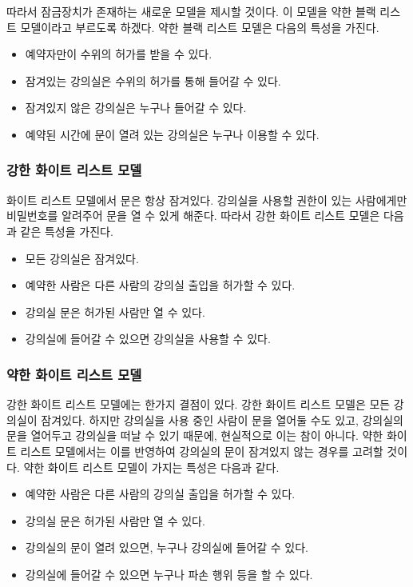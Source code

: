 \documentclass[11pt,a4paper]{article}
\begin{document}
따라서 잠금장치가 존재하는 새로운 모델을 제시할 것이다. 이 모델을 약한 블랙
리스트 모델이라고 부르도록 하겠다. 약한 블랙 리스트 모델은 다음의 특성을
가진다.
\begin{itemize}
\item 예약자만이 수위의 허가를 받을 수 있다.
\item 잠겨있는 강의실은 수위의 허가를 통해 들어갈 수 있다.
\item 잠겨있지 않은 강의실은 누구나 들어갈 수 있다.
\item 예약된 시간에 문이 열려 있는 강의실은 누구나 이용할 수 있다.
\end{itemize}

\subsubsection{강한 화이트 리스트 모델}
화이트 리스트 모델에서 문은 항상 잠겨있다. 강의실을 사용할 권한이 있는
사람에게만 비밀번호를 알려주어 문을 열 수 있게 해준다. 따라서 강한 화이트
리스트 모델은 다음과 같은 특성을 가진다.
\begin{itemize}
\item 모든 강의실은 잠겨있다.
\item 예약한 사람은 다른 사람의 강의실 출입을 허가할 수 있다.
\item 강의실 문은 허가된 사람만 열 수 있다.
\item 강의실에 들어갈 수 있으면 강의실을 사용할 수 있다.
\end{itemize}

\subsubsection{약한 화이트 리스트 모델}
강한 화이트 리스트 모델에는 한가지 결점이 있다. 강한 화이트 리스트 모델은 모든
강의실이 잠겨있다. 하지만 강의실을 사용 중인 사람이 문을 열어둘 수도 있고,
강의실의 문을 열어두고 강의실을 떠날 수 있기 때문에, 현실적으로 이는 참이
아니다. 약한 화이트 리스트 모델에서는 이를 반영하여 강의실의 문이 잠겨있지 않는
경우를 고려할 것이다. 약한 화이트 리스트 모델이 가지는 특성은 다음과 같다.
\begin{itemize}
\item 예약한 사람은 다른 사람의 강의실 출입을 허가할 수 있다.
\item 강의실 문은 허가된 사람만 열 수 있다.
\item 강의실의 문이 열려 있으면, 누구나 강의실에 들어갈 수 있다.
\item 강의실에 들어갈 수 있으면 누구나 파손 행위 등을 할 수 있다.
\end{itemize}
\end{document}
